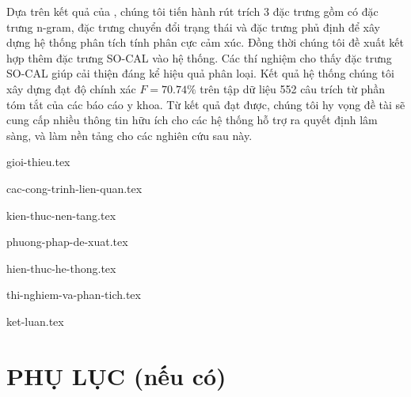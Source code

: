\documentclass[a4paper, 12pt]{article}
\theoremstyle{definition}
\begin{document}
Dựa trên kết quả của \cite{niu2005analysis}, chúng tôi tiến hành rút trích 3 đặc trưng gồm có đặc trưng n-gram, đặc trưng chuyển đổi trạng thái và đặc trưng phủ định để xây dựng hệ thống phân tích tính phân cực cảm xúc. Đồng thời chúng tôi đề xuất kết hợp thêm đặc trưng SO-CAL vào hệ thống. Các thí nghiệm cho thấy đặc trưng SO-CAL giúp cải thiện đáng kể hiệu quả phân loại. Kết quả hệ thống chúng tôi xây dựng đạt độ chính xác $F=70.74\%$ trên tập dữ liệu 552 câu trích từ phần tóm tắt của các báo cáo y khoa. Từ kết quả đạt được, chúng tôi hy vọng đề tài sẽ cung cấp nhiều thông tin hữu ích cho các hệ thống hỗ trợ ra quyết định lâm sàng, và làm nền tảng cho các nghiên cứu sau này.

\pagebreak
\tableofcontents

\thispagestyle{empty}
\pagebreak
\listoffigures
\pagebreak
\listoftables

\pagebreak

{gioi-thieu.tex}
\pagebreak

{cac-cong-trinh-lien-quan.tex}
\pagebreak

{kien-thuc-nen-tang.tex}
\pagebreak

{phuong-phap-de-xuat.tex}
\pagebreak

{hien-thuc-he-thong.tex}
\pagebreak

{thi-nghiem-va-phan-tich.tex}
\pagebreak

{ket-luan.tex}
\pagebreak

\printbibliography[title={Tài liệu tham khảo}]
\pagebreak

\section*{PHỤ LỤC (nếu có)}
\end{document}
